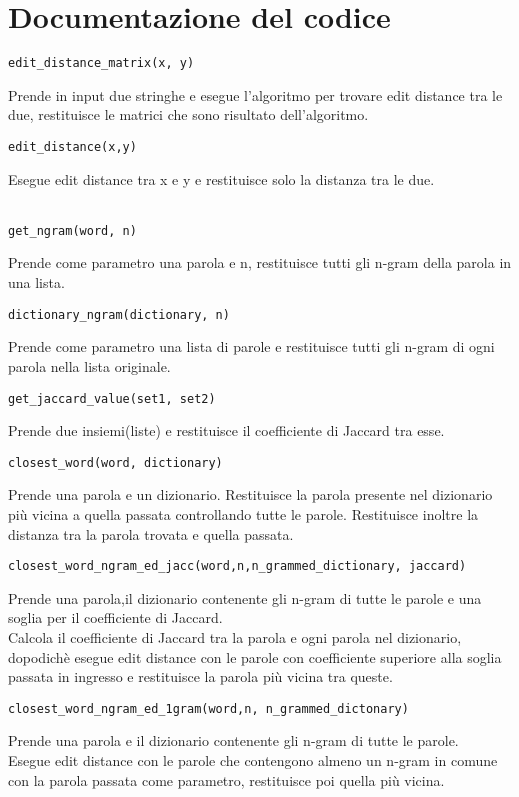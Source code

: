 \documentclass[]{article}
\begin{document}
\section{Documentazione del codice}
\begin{verbatim}
edit_distance_matrix(x, y)
\end{verbatim}
Prende in input due stringhe e esegue l'algoritmo per trovare edit distance tra le due, restituisce le matrici che sono risultato dell'algoritmo.\\
\begin{verbatim}
edit_distance(x,y)
\end{verbatim}
Esegue edit distance tra x e y e restituisce solo la distanza tra le due.\\\\
\begin{verbatim}
get_ngram(word, n)
\end{verbatim}
Prende come parametro una parola e n, restituisce tutti gli n-gram della parola in una lista.\\
\begin{verbatim}
dictionary_ngram(dictionary, n)
\end{verbatim}
Prende come parametro una lista di parole e restituisce tutti gli n-gram di ogni parola nella lista originale.\\
\begin{verbatim}
get_jaccard_value(set1, set2)
\end{verbatim}
Prende due insiemi(liste) e restituisce il coefficiente di Jaccard tra esse.\\
\begin{verbatim}
closest_word(word, dictionary)
\end{verbatim}
Prende una parola e un dizionario. Restituisce la parola presente nel dizionario più vicina a quella passata controllando tutte le parole. Restituisce inoltre la distanza tra la parola trovata e quella passata.\\
\begin{verbatim}
closest_word_ngram_ed_jacc(word,n,n_grammed_dictionary, jaccard)
\end{verbatim}
Prende una parola,il dizionario contenente gli n-gram di tutte le parole e una soglia per il coefficiente di Jaccard.\\
Calcola il coefficiente di Jaccard tra la parola e ogni parola nel dizionario, dopodichè esegue edit distance con le parole con coefficiente superiore alla soglia passata in ingresso e restituisce la parola più vicina tra queste.\\
\begin{verbatim}
closest_word_ngram_ed_1gram(word,n, n_grammed_dictonary)
\end{verbatim}
Prende una parola e il dizionario contenente gli n-gram di tutte le parole.\\
Esegue edit distance con le parole che contengono almeno un n-gram in comune con la parola passata come parametro, restituisce poi quella più vicina.
\end{document}
